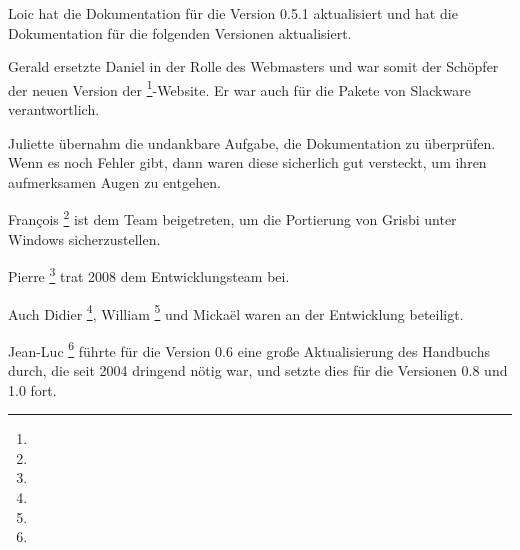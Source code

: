 Loic  hat die Dokumentation für die Version 0.5.1 aktualisiert und hat die Dokumentation für die folgenden Versionen aktualisiert.

Gerald  ersetzte Daniel  in der Rolle des Webmasters und war somit der Schöpfer der neuen Version der \footnote{\urlGrisbi{}}-Website. Er war auch für die Pakete von \gls{Slackware} verantwortlich.

Juliette  übernahm die undankbare Aufgabe, die Dokumentation zu überprüfen. Wenn es noch Fehler gibt, dann waren diese sicherlich gut versteckt, um ihren aufmerksamen Augen zu entgehen.

François \footnote{\urlFrancoisTerrotEmail{}} ist dem Team beigetreten, um die \gls{Portierung} von Grisbi unter \gls{Windows} sicherzustellen.

Pierre \footnote{\urlPierreBiavaEmail{}} trat 2008 dem Entwicklungsteam bei.

Auch Didier \footnote{\urlDidierChevalierEmail{}}, William \footnote{\urlWilliamOllivierEmail{}} und Mickaël  waren an der Entwicklung beteiligt.

Jean-Luc \footnote{\urlJeanLucDuflotEmail{}} führte für die Version 0.6 eine große Aktualisierung des Handbuchs durch, die seit 2004 dringend nötig war, und setzte dies für die Versionen 0.8 und 1.0 fort.

